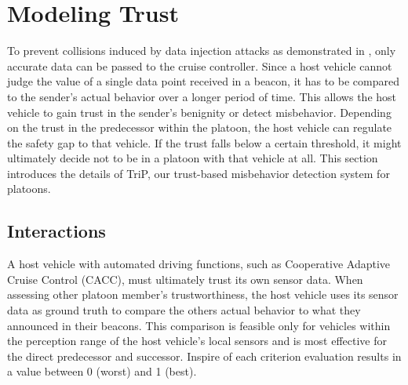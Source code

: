 \documentclass[letterpaper, 10pt, conference]{ieeeconf}  %
\begin{document}


\section{Modeling Trust}


To prevent collisions induced by data injection attacks as demonstrated in \cite{C_IDM}, only accurate data can be passed to the cruise controller. Since a host vehicle cannot judge the value of a single data point received in a beacon, it has to be compared to the sender's actual behavior over a longer period of time. This allows the host vehicle to gain trust in the sender's benignity or detect misbehavior. Depending on the trust in the predecessor within the platoon, the host vehicle can regulate the safety gap to that vehicle. If the trust falls below a certain threshold, it might ultimately decide not to be in a platoon with that vehicle at all. This section introduces the details of TriP, our trust-based misbehavior detection system for platoons.


\subsection{Interactions}

A host vehicle with automated driving functions, such as Cooperative Adaptive Cruise Control (CACC), must ultimately trust its own sensor data. When assessing other platoon member's trustworthiness, the host vehicle uses its sensor data as ground truth to compare the others actual behavior to what they announced in their beacons. This comparison is feasible only for vehicles within the perception range of the host vehicle's local sensors and is most effective for the direct predecessor and successor. Inspire of \cite{trust_simple, trust_complex} each criterion evaluation results in a value between 0 (worst) and 1 (best). 
\end{document}
